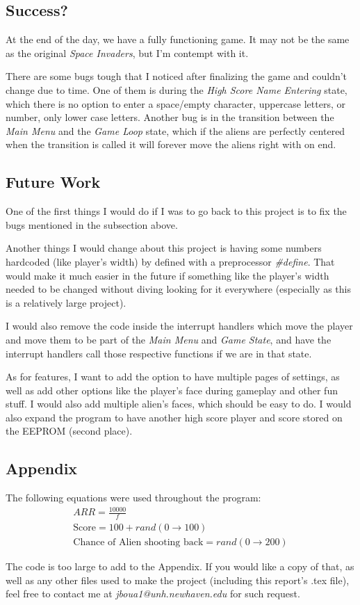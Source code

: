 \documentclass[12pt, a4paper]{article}
\begin{document}
    \subsection{Success?} \label{conc:sucandbugs}
    At the end of the day, we have a fully functioning game. It may not be the same as the original \textit{Space Invaders}, but I'm contempt with it. 
    
    There are some bugs tough that I noticed after finalizing the game and couldn't change due to time. One of them is during the \textit{High Score Name Entering} state, which there is no option to enter a space/empty character, uppercase letters, or number, only lower case letters. Another bug is in the transition between the \textit{Main Menu} and the \textit{Game Loop} state, which if the aliens are perfectly centered when the transition is called it will forever move the aliens right with on end.
    
    \subsection{Future Work} \label{conc:future}
    One of the first things I would do if I was to go back to this project is to fix the bugs mentioned in the subsection above. 
    
    Another things I would change about this project is having some numbers hardcoded (like player's width) by defined with a preprocessor \textit{\#define}. That would make it much easier in the future if something like the player's width needed to be changed without diving looking for it everywhere (especially as this is a relatively large project). 
    
    I would also remove the code inside the interrupt handlers which move the player and move them to be part of the \textit{Main Menu} and \textit{Game State}, and have the interrupt handlers call those respective functions if we are in that state. 
    
    As for features, I want to add the option to have multiple pages of settings, as well as add other options like the player's face during gameplay and other fun stuff. I would also add multiple alien's faces, which should be easy to do. I would also expand the program to have another high score player and score stored on the EEPROM (second place).
    
    \subsection{Appendix}
    The following equations were used throughout the program:
    \begin{gather}
     \label{eq:arrcalc} ARR = \frac{10000}{f}\\
     \label{eq:score} \text{Score} = 100 + rand(0\rightarrow 100) \\
     \label{eq:alienbulletchance} \text{Chance of Alien shooting back} = rand(0\rightarrow 200)
    \end{gather}
    
    The code is too large to add to the Appendix. If you would like a copy of that, as well as any other files used to make the project (including this report's .tex file), feel free to contact me at \textit{jboua1@unh.newhaven.edu} for such request.
    
    
\end{document}
